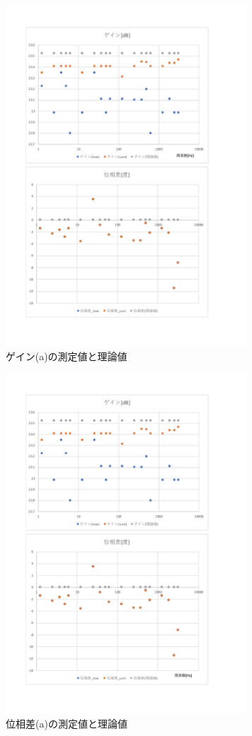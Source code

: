 \documentclass[uplatex, 11pt,a4j, titlepage]{jsarticle}
\begin{document}
\begin{figure}[h]
    \centering
    \includegraphics[width=9cm]{ideal_plot3.pdf}
    \caption{ゲイン(a)の測定値と理論値}
    \label{idealplot3}
\end{figure}

\begin{figure}[h]
    \centering
    \includegraphics[width=9cm]{ideal_plot4.pdf}
    \caption{位相差(a)の測定値と理論値}
    \label{idealplot4}
\end{figure}
\end{document}
